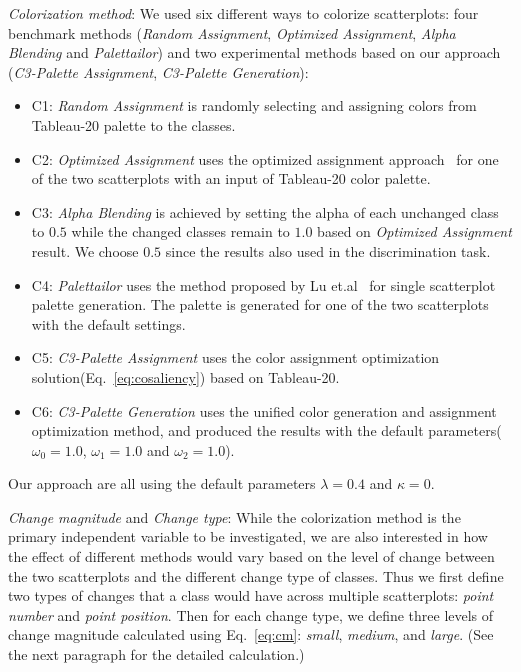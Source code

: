 \emph{Colorization method}: We used six different ways to colorize scatterplots: four benchmark methods (\emph{Random Assignment}, \emph{Optimized Assignment}, \emph{Alpha Blending} and \emph{Palettailor}) and two experimental methods based on our approach (\emph{C3-Palette Assignment}, \emph{C3-Palette Generation}):
\begin{itemize}

     \item C1: \emph{Random Assignment} is randomly selecting and assigning colors from Tableau-20 palette to the classes.

     \item C2: \emph{Optimized Assignment} uses the optimized assignment approach~\cite{Wang2018} for one of the two scatterplots with an input of Tableau-20 color palette.

     \item C3: \emph{Alpha Blending} is achieved by setting the alpha of each unchanged class to $0.5$ while the changed classes remain to $1.0$ based on \emph{Optimized Assignment} result. We choose $0.5$ since the results also used in the discrimination task.
     \item C4: \emph{Palettailor} uses the method proposed by Lu et.al~\cite{Lu21} for single scatterplot palette generation. The palette is generated for one of the two scatterplots with the default settings.
     \item C5: \emph{C3-Palette Assignment} uses the color assignment optimization solution(Eq.~\ref{eq:cosaliency}) based on Tableau-20.
     \item C6: \emph{C3-Palette Generation} uses the unified color generation and assignment optimization method, and produced the results with the default parameters($\omega_0=1.0$, $\omega_1=1.0$ and $\omega_2=1.0$).
\end{itemize}
Our approach are all using the default parameters $\lambda=0.4$ and $\kappa=0$.

\emph{Change magnitude} and \emph{Change type}: While the colorization method is the primary independent variable to be investigated, we are also interested in how the effect of different methods would vary based on the level of change between the two scatterplots and the different change type of classes. Thus we first define two types of changes that a class would have across multiple scatterplots: \emph{point number} and \emph{point position}. Then for each change type, we define three levels of change magnitude calculated using Eq.~\ref{eq:cm}: \emph{small}, \emph{medium}, and \emph{large}. (See the next paragraph for the detailed calculation.)

